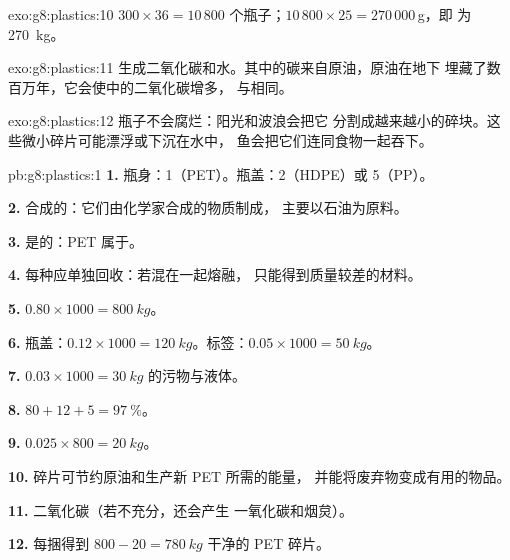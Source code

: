 \begin{solution}{exo:g8:plastics:10}
$300 \times 36 = 10\,800$ 个瓶子；$10\,800 \times 25 = 270\,000$\,g，即
为 \qty{270}{kg}。
\end{solution}

\begin{solution}{exo:g8:plastics:11}
生成二氧化碳和水。其中的碳来自原油，原油在地下
埋藏了数百万年，它会使中的二氧化碳增多，
与相同。
\end{solution}

\begin{solution}{exo:g8:plastics:12}
瓶子不会腐烂：阳光和波浪会把它
分割成越来越小的碎块。这些微小碎片可能漂浮或下沉在水中，
鱼会把它们连同食物一起吞下。
\end{solution}

\begin{solution}{pb:g8:plastics:1}
\textbf{1.} 瓶身：1（PET）。瓶盖：2（HDPE）或 5（PP）。

\textbf{2.} 合成的：它们由化学家合成的物质制成，
主要以石油为原料。

\textbf{3.} 是的：PET 属于。

\textbf{4.} 每种应单独回收：若混在一起熔融，
只能得到质量较差的材料。

\textbf{5.} $0.80 \times 1000 = \qty{800}{kg}$。

\textbf{6.} 瓶盖：$0.12 \times 1000 = \qty{120}{kg}$。标签：$0.05
\times 1000 = \qty{50}{kg}$。

\textbf{7.} $0.03 \times 1000 = \qty{30}{kg}$ 的污物与液体。

\textbf{8.} $80 + 12 + 5 = \qty{97}{\percent}$。

\textbf{9.} $0.025 \times 800 = \qty{20}{kg}$。

\textbf{10.} 碎片可节约原油和生产新 PET 所需的能量，
并能将废弃物变成有用的物品。

\textbf{11.} 二氧化碳（若不充分，还会产生
一氧化碳和烟炱）。

\textbf{12.} 每捆得到 $800 - 20 = \qty{780}{kg}$ 干净的 PET 碎片。
\end{solution}
